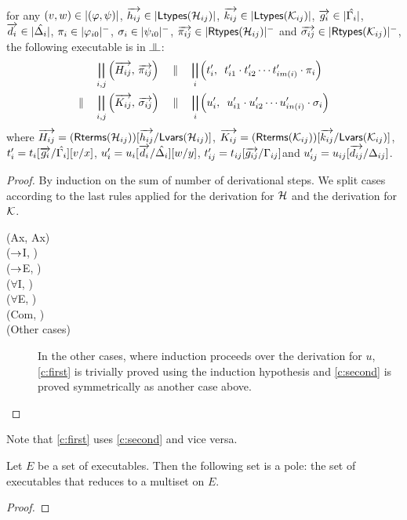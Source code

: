 \begin{proposition}[Adequacy]
\begin{enumerate}[label=(\arabic{*}), ref=\textit{(\arabic{*})}]
	for any $(v,w)\in|{(\varphi,\psi)}|$,
	$\overrightarrow{h_{ij}}\in|{\mathsf{Ltypes}({\mathcal{H}_{ij}})}|$,
	$\overrightarrow{k_{ij}}\in|{\mathsf{Ltypes}({\mathcal{K}_{ij}})}|$,
	$\overrightarrow{g_i}\in|{\hat{\Gamma_i}}|$,
	$\overrightarrow{d_i}\in|{\hat{\Delta_i}}|$,
	$\pi_i\in|{\varphi_{i0}}|^-$,
	$\sigma_i\in|{\psi_{i0}}|^-$,
	$\overrightarrow{\pi_{ij}}\in|{\mathsf{Rtypes}({\mathcal{H}_{ij}})}|^-$ and
	$\overrightarrow{\sigma_{ij}}\in|{\mathsf{Rtypes}({\mathcal{K}_{ij}})}|^-$,
	the following executable is in $\bbot$:
	\begin{align*}
	       & 	 \bigparallel_{i,j}\left(\overrightarrow{H_{ij}},\,
	\overrightarrow{\pi_{ij}}\right)\quad \parallel\quad
	\bigparallel_i\left(t_i',\,\,\,t'_{i1}\cdot t'_{i2}\cdots
	t'_{im(i)}\cdot \pi_i\right)
\\
	 \parallel\quad  &
	 \bigparallel_{i,j}\left(\overrightarrow{K_{ij}},\,
	\overrightarrow{\sigma_{ij}}\right)\quad \parallel\quad
	\bigparallel_i\left(u_i',\,\,\,u'_{i1}\cdot u'_{i2}\cdots
	u'_{in(i)}\cdot \sigma_i\right)
	\end{align*}
	where
	$\overrightarrow{H_{ij}}=(\mathsf{Rterms}({\mathcal{H}_{ij}}))[\overrightarrow{h_{ij}}/\mathsf{Lvars}({\mathcal{H}_{ij}})]$,\quad
	$\overrightarrow{K_{ij}}=(\mathsf{Rterms}({\mathcal{K}_{ij}}))[\overrightarrow{k_{ij}}/\mathsf{Lvars}({\mathcal{K}_{ij}})]$,\quad
	$t'_i=t_i[\overrightarrow{g_i}/\hat{\Gamma_i}][v/x]$,\quad
	$u'_i=u_i[\overrightarrow{d_i}/\hat{\Delta_i}][w/y]$,\quad
	$t'_{ij}=t_{ij}[\overrightarrow{g_{ij}}/\Gamma_{ij}]$\quad and
	$u'_{ij}=u_{ij}[\overrightarrow{d_{ij}}/\Delta_{ij}]$\enspace.
 \end{enumerate}
\end{proposition}
\begin{proof}
 By induction on the sum of number of derivational steps.
 We split cases according to the last rules applied for the
 derivation for $\mathcal{H}$ and the derivation for $\mathcal{K}$.
 \begin{description}
  \item[(Ax, Ax)]
  \item[($\rightarrow$I, \textminus)]
  \item[($\rightarrow$E, \textminus)]
  \item[($\forall$I, \textminus)]
  \item[($\forall$E, \textminus)]
  \item[(Com, \textminus)]
  \item[(Other cases)] In the other cases,
       where induction proceeds over the derivation for $u$,
       \ref{c:first} is trivially proved using the induction
       hypothesis and \ref{c:second} is proved
       symmetrically as another case above.
 \end{description}
\end{proof}
Note that \ref{c:first} uses \ref{c:second} and vice versa.

\begin{proposition}
 Let $E$ be a set of executables.
 Then the following set is a pole: the set of executables that reduces to
 a multiset on $E$.
\end{proposition}
\begin{proof}
\end{proof}

